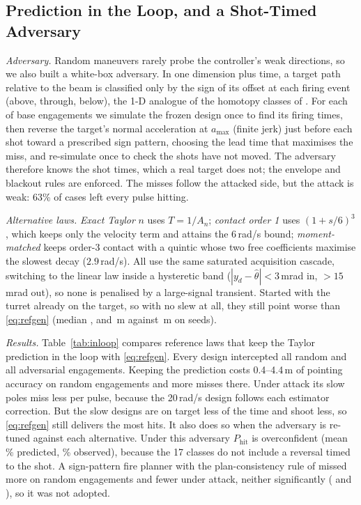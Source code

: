 \documentclass[conference]{IEEEtran}
\begin{document}
\subsection{Prediction in the Loop, and a Shot-Timed Adversary}
\label{sec:inloop}
\emph{Adversary.} Random maneuvers rarely probe the controller's weak directions, so we also built a white-box adversary. In one dimension plus time, a target path relative to the beam is classified only by the sign of its offset at each firing event (above, through, below), the 1-D analogue of the homotopy classes of \cite{degroot2024tmpc}. For each of \hgN{} base engagements we simulate the frozen design once to find its firing times, then reverse the target's normal acceleration at $a_{\max}$ (finite jerk) just before each shot toward a prescribed sign pattern, choosing the lead time that maximises the miss, and re-simulate once to check the shots have not moved. The adversary therefore knows the shot times, which a real target does not; the envelope and blackout rules are enforced. The misses follow the attacked side, but the attack is weak: 63\% of cases left every pulse hitting.

\emph{Alternative laws.} \emph{Exact Taylor} $n$ uses $T=1/A_n$; \emph{contact order 1} uses $(1+s/6)^3$, which keeps only the velocity term and attains the 6\,rad/s bound; \emph{moment-matched} keeps order-3 contact with a quintic whose two free coefficients maximise the slowest decay ($2.9$\,rad/s). All use the same saturated acquisition cascade, switching to the linear law inside a hysteretic band ($|y_d-\hat\theta|<3$\,mrad in, $>15$\,mrad out), so none is penalised by a large-signal transient. Started with the turret already on the target, so with no slew at all, they still point worse than \eqref{eq:refgen} (median \nsExactRms, \nsContactRms{} and \nsMmRms\,m against \nsFinalRms\,m on \nsN{} seeds).

\emph{Results.} Table~\ref{tab:inloop} compares reference laws that keep the Taylor prediction in the loop with \eqref{eq:refgen}. Every design intercepted all random and all adversarial engagements. Keeping the prediction costs 0.4--4.4\,m of pointing accuracy on random engagements and more misses there. Under attack its slow poles miss less per pulse, because the 20\,rad/s design follows each estimator correction. But the slow designs are on target less of the time and shoot less, so \eqref{eq:refgen} still delivers the most hits. It also does so when the adversary is re-tuned against each alternative. Under this adversary $P_{\mathrm{hit}}$ is overconfident (mean \hgPhitPred\% predicted, \hgPhitObs\% observed), because the 17 classes do not include a reversal timed to the shot. A sign-pattern fire planner with the plan-consistency rule of \cite{degroot2024tmpc} missed more on random engagements and fewer under attack, neither significantly (\homMiss{} and \homHgMiss), so it was not adopted.
\end{document}
